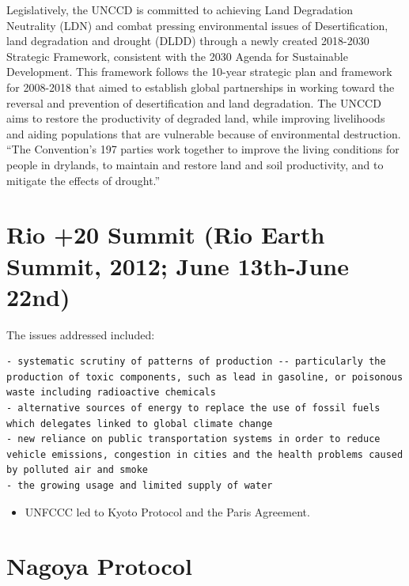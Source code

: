 \documentclass[
  openany]{book}
\providecommand{\tightlist}{%
  \setlength{\itemsep}{0pt}\setlength{\parskip}{0pt}}
\begin{document}
Legislatively, the UNCCD is committed to achieving Land Degradation Neutrality (LDN) and combat pressing environmental issues of Desertification, land degradation and drought (DLDD) through a newly created 2018-2030 Strategic Framework, consistent with the 2030 Agenda for Sustainable Development. This framework follows the 10-year strategic plan and framework for 2008-2018 that aimed to establish global partnerships in working toward the reversal and prevention of desertification and land degradation. The UNCCD aims to restore the productivity of degraded land, while improving livelihoods and aiding populations that are vulnerable because of environmental destruction. ``The Convention's 197 parties work together to improve the living conditions for people in drylands, to maintain and restore land and soil productivity, and to mitigate the effects of drought.''

\hypertarget{rio-20-summit-rio-earth-summit-2012-june-13th-june-22nd}{%
\section{Rio +20 Summit (Rio Earth Summit, 2012; June 13th-June 22nd)}\label{rio-20-summit-rio-earth-summit-2012-june-13th-june-22nd}}

The issues addressed included:

\begin{verbatim}
- systematic scrutiny of patterns of production -- particularly the production of toxic components, such as lead in gasoline, or poisonous waste including radioactive chemicals
- alternative sources of energy to replace the use of fossil fuels which delegates linked to global climate change
- new reliance on public transportation systems in order to reduce vehicle emissions, congestion in cities and the health problems caused by polluted air and smoke
- the growing usage and limited supply of water
\end{verbatim}

\begin{itemize}
\tightlist
\item
  UNFCCC led to Kyoto Protocol and the Paris Agreement.
\end{itemize}

\hypertarget{nagoya-protocol}{%
\section{Nagoya Protocol}\label{nagoya-protocol}}
\end{document}

